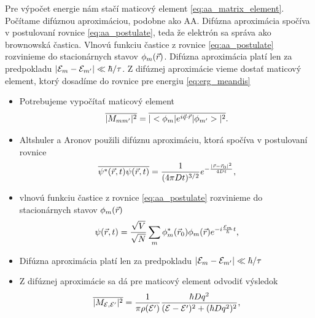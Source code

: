 \documentclass[
	11pt, %
]{beamer}
\begin{document}
\begin{frame}
\note
{
Pre výpočet energie nám stačí maticový element \eqref{eq:aa_matrix_element}. Počítame difúznou aproximáciou, podobne ako AA. 
 Difúzna aproximácia spočíva v postulovaní rovnice \eqref{eq:aa_postulate}, teda že elektrón sa správa ako brownowská častica.
  Vlnovú funkciu častice z rovnice \eqref{eq:aa_postulate} rozvinieme do stacionárnych stavov $\phi_m(\vec{r})$.
  Difúzna aproximácia platí len za predpokladu $|\mathcal{E}_m-\mathcal{E}_{m'}|\ll\hbar / \tau$. Z difúznej aproximácie vieme dostať maticový element, ktorý dosadíme  do rovnice pre energiu \eqref{eq:erg_meandis}
}

\begin{itemize}
\item Potrebujeme vypočítať maticový element
\begin{equation}
\label{eq:aa_matrix_element}
\overline{| M_{mm'}|^2} =\overline{|<\phi_m|e^{i\vec{q}\cdot\vec{r}}|\phi_{m'}>|^2} \text{.}
\end{equation}
\item Altshuler a Aronov použili difúznu aproximáciu, ktorá spočíva v postulovaní rovnice
\begin{equation}
 \label{eq:aa_postulate}
 \overline{\psi^*(\vec{r},t)\psi(\vec{r},t)}=\frac{1}{(4\pi Dt)^{3/2}}e^{-\frac{|\vec{r}-\vec{r}_0|^2}{4Dt}} \text{,}
\end{equation}
\item vlnovú funkciu častice z rovnice \eqref{eq:aa_postulate} rozvinieme do stacionárnych stavov $\phi_m(\vec{r})$
\begin{equation}
 \label{eq:aa_psi_sum}
 \psi(\vec{r},t)=\frac{\sqrt{V}}{\sqrt{N}}\sum_m \phi_m^*(\vec{r}_0)\phi_m(\vec{r})e^{-i\frac{\mathcal{E}_m}{\hbar}t} \text{,}
\end{equation}
\item Difúzna aproximácia platí len za predpokladu $|\mathcal{E}_m-\mathcal{E}_{m'}|\ll\hbar / \tau$
\item Z difúznej aproximácie sa dá pre maticový element odvodiť výsledok
\begin{equation}
 \label{eq:aa_matrix_element_final}
 \overline{|M_{\mathcal{E}, \mathcal{E}'}|^2}=\frac{1}{\pi \rho(\mathcal{E}')} \frac{\hbar D q^2}{(\mathcal{E}-\mathcal{E}')^2+(\hbar Dq^2)^2}\text{,}
\end{equation}
\end{itemize}
\end{frame}
\end{document}
